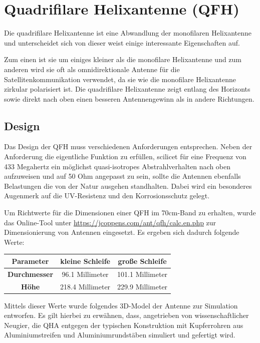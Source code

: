 \chapter{Quadrifilare Helixantenne (QFH)}
\label{chap:qfh}
Die quadrifilare Helixantenne ist eine Abwandlung der monofilaren Helixantenne und unterscheidet sich von dieser weist einige interessante Eigenschaften auf.

Zum einen ist sie um einiges kleiner als die monofilare Helixantenne und zum anderen wird sie oft als omnidirektionale Antenne für die Satellitenkommunikation verwendet, da sie wie die monofilare Helixantenne zirkular polarisiert ist. Die quadrifilare Helixantenne zeigt entlang des Horizonts sowie direkt nach oben einen besseren Antennengewinn als in andere Richtungen.

\section{Design}
Das Design der QFH muss verschiedenen Anforderungen entsprechen. Neben der Anforderung die eigentliche Funktion zu erfüllen, scilicet für eine Frequenz von 433 Megahertz ein möglichst quasi-isotropes Abstrahlverhalten nach oben aufzuweisen und auf 50 Ohm angepasst zu sein, sollte die Antennen ebenfalls Belastungen die von der Natur ausgehen standhalten. Dabei wird ein besonderes Augenmerk auf die UV-Resistenz und den Korrosionsschutz gelegt. 

Um Richtwerte für die Dimensionen einer QFH im 70cm-Band zu erhalten, wurde das Online-Tool unter \url{https://jcoppens.com/ant/qfh/calc.en.php} zur Dimensionierung von Antennen eingesetzt. Es ergeben sich dadurch folgende Werte:

\begin{center}
	\begin{tabular}{|c|c|c|}
		\hline
		\textbf{Parameter} & \textbf{kleine Schleife} & \textbf{große Schleife} \\
		\hline
		\textbf{Durchmesser} & 96.1 Millimeter & 101.1 Millimeter \\
		\hline
		\textbf{Höhe} & 218.4 Millimeter & 229.9 Millimeter \\
		\hline
	\end{tabular}
\end{center}

Mittels dieser Werte wurde folgendes 3D-Model der Antenne zur Simulation entworfen. Es gilt hierbei zu erwähnen, dass, angetrieben von wissenschaftlicher Neugier, die QHA entgegen der typischen Konstruktion mit Kupferrohren aus Aluminiumstreifen und Aluminiumrundstäben simuliert und gefertigt wird. 

